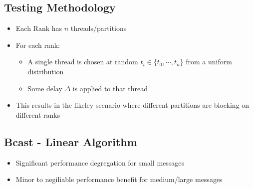 \documentclass{article}
\begin{document}
  \subsection{Testing Methodology}
  \begin{itemize}
    \item Each Rank has $n$ threads/partitions
    \item For each rank:
    \begin{itemize}
      \item A single thread is chosen at random $t_i \in \{t_0, \cdots, t_n\}$ from a uniform distribution
      \item Some delay $\Delta$ is applied to that thread
    \end{itemize}
    \item This results in the likeley secnario where different partitions are
          blocking on different ranks
  \end{itemize}

  \subsection{Bcast - Linear Algorithm}
  \begin{itemize}
    \item Significant performance degregation for small messages
    \item Minor to negiliable performance benefit for medium/large messages
  \end{itemize}
\end{document}
